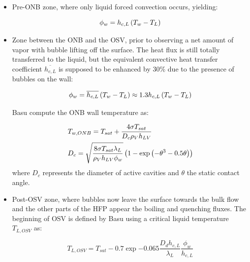 \begin{itemize}
\item Pre-ONB zone, where only liquid forced convection occurs, yielding:

\begin{equation}
\phi_{w}=h_{c,L} \left( T_{w}-T_{L} \right)
\label{eq:basu_hfp_preONB}
\end{equation}

\item Zone between the ONB and the OSV, prior to observing a net amount of vapor with bubble lifting off the surface. The heat flux is still totally transferred to the liquid, but the equivalent convective heat transfer coefficient $\overline{h_{c,L}}$ is supposed to be enhanced by 30\% due to the presence of bubbles on the wall:

\begin{equation}
\phi_{w}=\overline{h_{c,L}} \left( T_{w}-T_{L} \right)\approx 1.3 h_{c,L}\left( T_{w}-T_{L} \right)
\label{eq:basu_hfp_postONB}
\end{equation}

Basu \etal compute the ONB wall temperature as:

\begin{align}
&T_{w, ONB}= T_{sat} + \frac{4 \sigma T_{sat}}{D_{c}\rho_{V} h_{LV}}\\
%
&D_{c}= \sqrt{\frac{8 \sigma T_{sat} \lambda_{L}}{\rho_{V} h_{LV} \phi_{w}}}\parth{ 1- \exp{ - \theta^{3} - 0.5 \theta}  }
\label{eq:basu_hfp_ONB}
\end{align}
where $D_{c}$ represents the diameter of active cavities and $\theta$ the static contact angle.

\item Post-OSV zone, where bubbles now leave the surface towards the bulk flow and the other parts of the HFP appear \ie the boiling and quenching fluxes. The beginning of OSV is defined by Basu \etal using a critical liquid temperature $T_{L,OSV}$ as:

\begin{equation}
T_{L,OSV}=T_{sat}-0.7\exp{-0.065 \frac{D_{d}h_{c,L}}{\lambda_{L}}}\frac{\phi_{w}}{h_{c,L}}
\label{eq:basu_hfp_TLOSV}
\end{equation}

\end{itemize}


